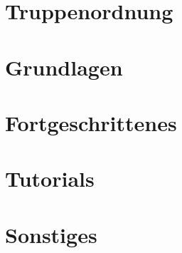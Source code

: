 \documentclass[pdftex,fontsize=12pt,a4paper,numbers=noenddot]{scrreprt}
\begin{document}


\newpage
{} %
\tableofcontents %

\newpage
{} %


\chapter{Truppenordnung}

\pagebreak

\chapter{Grundlagen}








\pagebreak

\chapter{Fortgeschrittenes}










\pagebreak

\chapter{Tutorials}

\pagebreak

\chapter{Sonstiges}





\cleardoublepage
\appendix
\end{document}
